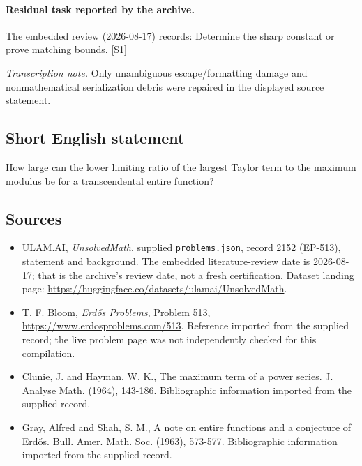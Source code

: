 \documentclass[11pt,a4paper]{article}
\newcommand{\sref}[2]{\hyperlink{source:#1:#2}{[S#2]}}
\begin{document}
\paragraph{Residual task reported by the archive.}

The embedded review (2026-08-17) records: Determine the sharp constant or prove matching bounds. \sref{2152}{1}

{\small\emph{Transcription note.} Only unambiguous escape/formatting damage and nonmathematical serialization debris were repaired in the displayed source statement.}

\subsection{Short English statement}

How large can the lower limiting ratio of the largest Taylor term to the maximum modulus be for a transcendental entire function?

\subsection{Sources}

{\small

\begin{itemize}

\item[\hypertarget{source:2152:1}{S1}] ULAM.AI, \emph{UnsolvedMath}, supplied \texttt{problems.json}, record 2152 (EP-513), statement and background. The embedded literature-review date is 2026-08-17; that is the archive’s review date, not a fresh certification. Dataset landing page: \url{https://huggingface.co/datasets/ulamai/UnsolvedMath}.

\item[\hypertarget{source:2152:2}{S2}] T. F. Bloom, \emph{Erdős Problems}, Problem 513, \url{https://www.erdosproblems.com/513}. Reference imported from the supplied record; the live problem page was not independently checked for this compilation.

\item[\hypertarget{source:2152:3}{S3}] Clunie, J. and Hayman, W. K., The maximum term of a power series. J. Analyse Math. (1964), 143-186. Bibliographic information imported from the supplied record.

\item[\hypertarget{source:2152:4}{S4}] Gray, Alfred and Shah, S. M., A note on entire functions and a conjecture of Erd\H{o}s. Bull. Amer. Math. Soc. (1963), 573-577. Bibliographic information imported from the supplied record.

\end{itemize}

}

\label{end:2152}
\end{document}
